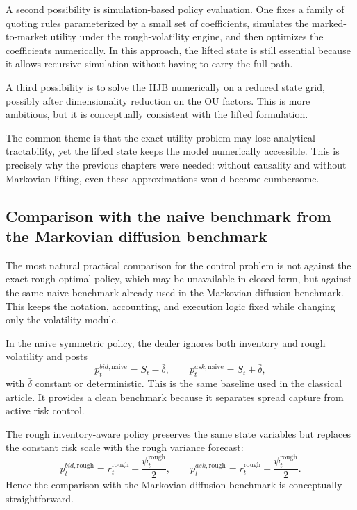 A second possibility is simulation-based policy evaluation. One fixes a family of quoting rules parameterized by a small set of coefficients, simulates the marked-to-market utility under the rough-volatility engine, and then optimizes the coefficients numerically. In this approach, the lifted state is still essential because it allows recursive simulation without having to carry the full path.

A third possibility is to solve the HJB numerically on a reduced state grid, possibly after dimensionality reduction on the OU factors. This is more ambitious, but it is conceptually consistent with the lifted formulation.

The common theme is that the exact utility problem may lose analytical tractability, yet the lifted state keeps the model numerically accessible. This is precisely why the previous chapters were needed: without causality and without Markovian lifting, even these approximations would become cumbersome.

\subsection{Comparison with the naive benchmark from the Markovian diffusion benchmark}

The most natural practical comparison for the control problem is not against the exact rough-optimal policy, which may be unavailable in closed form, but against the same naive benchmark already used in the Markovian diffusion benchmark. This keeps the notation, accounting, and execution logic fixed while changing only the volatility module.

In the naive symmetric policy, the dealer ignores both inventory and rough volatility and posts
\[
p_t^{bid,\mathrm{naive}} = S_t-\bar\delta,
\qquad
p_t^{ask,\mathrm{naive}} = S_t+\bar\delta,
\]
with \(\bar\delta\) constant or deterministic. This is the same baseline used in the classical article. It provides a clean benchmark because it separates spread capture from active risk control.

The rough inventory-aware policy preserves the same state variables but replaces the constant risk scale with the rough variance forecast:
\[
p_t^{bid,\mathrm{rough}} = r_t^{\mathrm{rough}}-\frac{\psi_t^{\mathrm{rough}}}{2},
\qquad
p_t^{ask,\mathrm{rough}} = r_t^{\mathrm{rough}}+\frac{\psi_t^{\mathrm{rough}}}{2}.
\]
Hence the comparison with the Markovian diffusion benchmark is conceptually straightforward.

